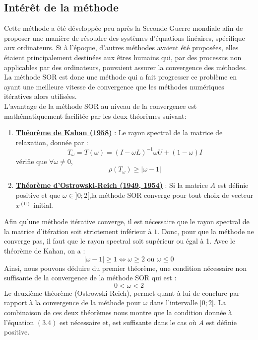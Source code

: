\subsection{Intérêt de la méthode}
Cette méthode a été développée peu après la Seconde Guerre mondiale afin de proposer une manière de résoudre des systèmes d'équations linéaires, spécifique aux ordinateurs. Si à l'époque, d'autres méthodes avaient été proposées, elles étaient principalement destinées aux êtres humains qui, par des processus non applicables par des ordinateurs, pouvaient assurer la convergence des méthodes. La méthode SOR est donc une méthode qui a fait progresser ce problème en ayant une meilleure vitesse de convergence que les méthodes numériques itératives alors utilisées.\\

L'avantage de la méthode SOR au niveau de la convergence est mathématiquement facilitée par les deux théorèmes suivant:
\begin{enumerate}
	\item \textbf{\underline{Théorème de Kahan (1958)}} : Le rayon spectral de la matrice de relaxation, donnée par :
	$$
	T_\omega=T(\omega)=(I-\omega L)^{-1}{\omega U +(1-\omega)I}
	$$
	vérifie que $\forall \omega \neq 0$,
	$$
	\rho(T_\omega)\geq|\omega -1|
	$$
	\item \textbf{\underline{Théorème d'Ostrowski-Reich (1949, 1954)}} : Si la matrice $A$ est définie positive et que $\omega \in ]0;2[$,la méthode SOR converge pour tout choix de vecteur $x^{(0)}$ initial.
\end{enumerate}
Afin qu'une méthode itérative converge, il est nécessaire que le rayon spectral de la matrice d'itération soit strictement inférieur à $1$. Donc, pour que la méthode ne converge pas, il faut que le rayon spectral soit supérieur ou égal à 1. Avec le théorème de Kahan, on a :
$$
|\omega -1|\geq 1 \Leftrightarrow \omega \geq 2 \text{ ou } \omega \leq 0 
$$
Ainsi, nous pouvons déduire du premier théorème, une condition nécessaire non suffisante de la convergence de la méthode SOR qui est :
\begin{equation}
0<\omega<2
\end{equation}
Le deuxième théorème (Ostrowski-Reich), permet quant à lui de conclure par rapport à la convergence de la méthode pour $\omega$ dans l'intervalle $]0;2[$. La combinaison de ces deux théorèmes nous montre que la condition donnée à l'équation $(3.4)$ est nécessaire et, est suffisante dans le cas où $A$ est définie positive.\\

